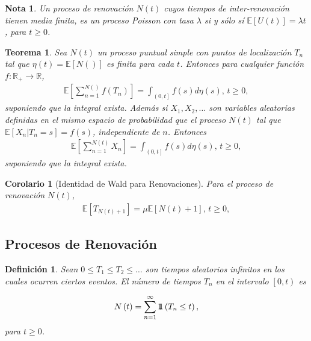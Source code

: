 \documentclass{article}
\newtheorem{Def}{Definición}
\newtheorem{Teo}{Teorema}
\newtheorem{Note}{Nota}
\newtheorem{Coro}{Corolario}
\newcommand{\rea}{\mathbb{R}}
\newcommand{\esp}{\mathbb{E}}
\newcommand{\indora}{\mbox{$1$\hspace{-0.8ex}$1$}}
\begin{document}
\begin{Note}
Un proceso de renovaci\'on $N\left(t\right)$ cuyos tiempos de inter-renovaci\'on tienen media finita, es un proceso Poisson con tasa $\lambda$ si y s\'olo s\'i $\esp\left[U\left(t\right)\right]=\lambda t$, para $t\geq0$.
\end{Note}


\begin{Teo}
Sea $N\left(t\right)$ un proceso puntual simple con puntos de localizaci\'on $T_{n}$ tal que $\eta\left(t\right)=\esp\left[N\left(\right)\right]$ es finita para cada $t$. Entonces para cualquier funci\'on $f:\rea_{+}\rightarrow\rea$,
\begin{eqnarray*}
\esp\left[\sum_{n=1}^{N\left(\right)}f\left(T_{n}\right)\right]=\int_{\left(0,t\right]}f\left(s\right)d\eta\left(s\right)\textrm{,  }t\geq0,
\end{eqnarray*}
suponiendo que la integral exista. Adem\'as si $X_{1},X_{2},\ldots$ son variables aleatorias definidas en el mismo espacio de probabilidad que el proceso $N\left(t\right)$ tal que $\esp\left[X_{n}|T_{n}=s\right]=f\left(s\right)$, independiente de $n$. Entonces
\begin{eqnarray*}
\esp\left[\sum_{n=1}^{N\left(t\right)}X_{n}\right]=\int_{\left(0,t\right]}f\left(s\right)d\eta\left(s\right)\textrm{,  }t\geq0,
\end{eqnarray*} 
suponiendo que la integral exista. 
\end{Teo}

\begin{Coro}[Identidad de Wald para Renovaciones]
Para el proceso de renovaci\'on $N\left(t\right)$,
\begin{eqnarray*}
\esp\left[T_{N\left(t\right)+1}\right]=\mu\esp\left[N\left(t\right)+1\right]\textrm{,  }t\geq0,
\end{eqnarray*}  
\end{Coro}

\subsection{Procesos de Renovaci\'on}

\begin{Def}\label{Def.Tn}
Sean $0\leq T_{1}\leq T_{2}\leq \ldots$ son tiempos aleatorios infinitos en los cuales ocurren ciertos eventos. El n\'umero de tiempos $T_{n}$ en el intervalo $\left[0,t\right)$ es

\begin{eqnarray}
N\left(t\right)=\sum_{n=1}^{\infty}\indora\left(T_{n}\leq t\right),
\end{eqnarray}
para $t\geq0$.
\end{Def}
\end{document}
